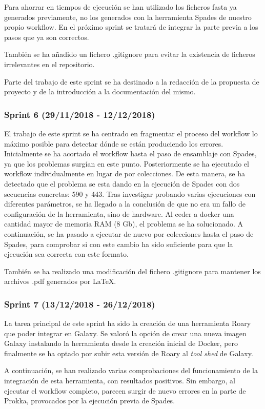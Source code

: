 Para ahorrar en tiempos de ejecución se han utilizado los ficheros fasta ya generados previamente, no los generados con la herramienta Spades de nuestro propio workflow. En el próximo sprint se tratará de integrar la parte previa a los pasos que ya son correctos.

También se ha añadido un fichero .gitignore para evitar la existencia de ficheros irrelevantes en el repositorio.

Parte del trabajo de este sprint se ha destinado a la redacción de la propuesta de proyecto y de la introducción a la documentación del mismo.

\subsubsection{Sprint 6 (29/11/2018 - 12/12/2018)}
El trabajo de este sprint se ha centrado en fragmentar el proceso del workflow lo máximo posible para detectar dónde se están produciendo los errores.
Inicialmente se ha acortado el workflow hasta el paso de ensamblaje con Spades, ya que los problemas surgían en este punto. Posteriormente se ha ejecutado el workflow individualmente en lugar de por colecciones. De esta manera, se ha detectado que el problema se esta dando en la ejecución de Spades con dos secuencias concretas: 590 y 443. Tras investigar probando varias ejecuciones con diferentes parámetros, se ha llegado a la conclusión de que no era un fallo de configuración de la herramienta, sino de hardware. Al ceder a docker una cantidad mayor de memoria RAM (8 Gb), el problema se ha solucionado. 
A continuación, se ha pasado a ejecutar de nuevo por colecciones hasta el paso de Spades, para comprobar si con este cambio ha sido suficiente para que la ejecución sea correcta con este formato. 

También se ha realizado una modificación del fichero .gitignore para mantener los archivos .pdf generados por \LaTeX.

\subsubsection{Sprint 7 (13/12/2018 - 26/12/2018)}
La tarea principal de este sprint ha sido la creación de una herramienta Roary que poder integrar en Galaxy. Se valoró la opción de crear una nueva imagen Galaxy instalando la herramienta desde la creación inicial de Docker, pero finalmente se ha optado por subir esta versión de Roary al \emph{tool shed} de Galaxy.

A continuación, se han realizado varias comprobaciones del funcionamiento de la integración de esta herramienta, con resultados positivos. Sin embargo, al ejecutar el workflow completo, parecen surgir de nuevo errores en la parte de Prokka, provocados por la ejecución previa de Spades. 

